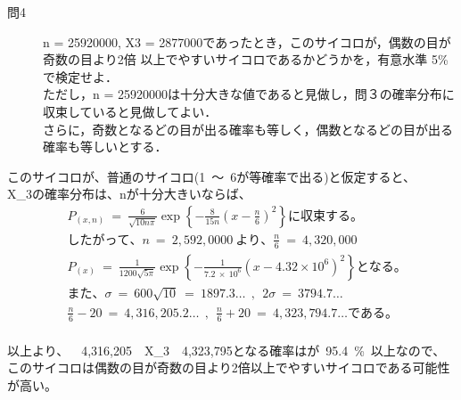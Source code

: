 \documentclass[12pt,a4paper]{jsarticle}
\begin{document}
\begin{description}
    \item [問4] n = 25920000, X3 = 2877000であったとき，このサイコロが，偶数の目が奇数の目より2倍
    以上でやすいサイコロであるかどうかを，有意水準 5{\%}で検定せよ．\\
    ただし，n = 25920000は十分大きな値であると見做し，問３の確率分布に収束していると見做してよい．\\
    さらに，奇数となるどの目が出る確率も等しく，偶数となるどの目が出る確率も等しいとする．
\end{description}

このサイコロが、普通のサイコロ(1~〜~6が等確率で出る)と仮定すると、\\
X_{3}の確率分布は、nが十分大きいならば、\\

\begin{align*}
    &P_{(x,n)} ~=~ \frac{6}{\sqrt{10n{\pi}}} \exp\left\{ -\frac{8}{15n}\left(x - \frac{n}{6}\right)^2  \right\}に収束する。\\
    &したがって、n ~=~ 2,592,0000~より、\frac{n}{6} ~=~ 4,320,000 \\
    &P_{(x)} ~=~ \frac{1}{1200\sqrt{5\pi}}\exp\left\{ -\frac{1}{7.2~×~10^6}\left(x-4.32×10^6\right)^2 \right\} となる。\\
    &また、\sigma ~=~ 600\sqrt{10} ~=~ 1897.3\dots ~~,~~ 2\sigma ~=~ 3794.7\dots \\
    &\frac{n}{6}-20 ~=~ 4,316,205.2\dots ~~,~~ \frac{n}{6}+20 ~=~ 4,323,794.7\dots である。\\
\end{align*}

以上より、~~4,316,205~\leqq~X_{3}~\leqq~4,323,795となる確率はが~95.4~\%~以上なので、\\
このサイコロは偶数の目が奇数の目より2倍以上でやすいサイコロである可能性が高い。\\
\end{document}
